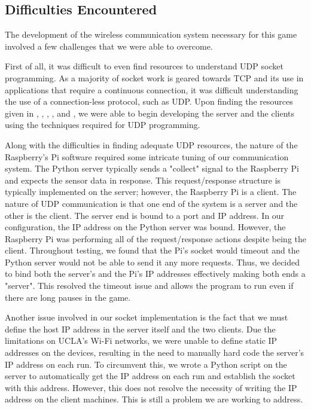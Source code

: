 \documentclass[titlepage, 12pt]{scrartcl}
\begin{document}
    \subsection{Difficulties Encountered}
        The development of the wireless communication system necessary for this game involved a few challenges that we were able to overcome. \par
        First of all, it was difficult to even find resources to understand UDP socket programming. As a majority of socket work is geared towards TCP and its use in applications that require a continuous connection, it was difficult understanding the use of a connection-less protocol, such as UDP. Upon finding the resources given in \cite{moon_2012}, \cite{karelz}, \cite{raspberry_pi_stack_exchange}, \cite{stack_overflow}, and \cite{karelz_2}, we were able to begin developing the server and the clients using the techniques required for UDP programming. \par
        Along with the difficulties in finding adequate UDP resources, the nature of the Raspberry's Pi software required some intricate tuning of our communication system. The Python server typically sends a "collect" signal to the Raspberry Pi and expects the sensor data in response. This request/response structure is typically implemented on the server; however, the Raspberry Pi is a client. The nature of UDP communication is that one end of the system is a server and the other is the client. The server end is bound to a port and IP address. In our configuration, the IP address on the Python server was bound. However, the Raspberry Pi was performing all of the request/response actions despite being the client. Throughout testing, we found that the Pi's socket would timeout and the Python server would not be able to send it any more requests. Thus, we decided to bind both the server's and the Pi's IP addresses effectively making both ends a "server". This resolved the timeout issue and allows the program to run even if there are long pauses in the game. \par
        Another issue involved in our socket implementation is the fact that we must define the host IP address in the server itself and the two clients. Due the limitations on UCLA's Wi-Fi networks, we were unable to define static IP addresses on the devices, resulting in the need to manually hard code the server's IP address on each run. To circumvent this, we wrote a Python script on the server to automatically get the IP address on each run and establish the socket with this address. However, this does not resolve the necessity of writing the IP address on the client machines. This is still a problem we are working to address. \par
\end{document}
